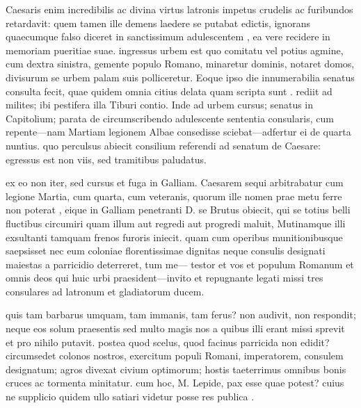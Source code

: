  Caesaris enim incredibilis ac divina virtus latronis impetus crudelis ac furibundos retardavit: quem tamen ille demens laedere se putabat edictis, ignorans quaecumque falso diceret in sanctissimum adulescentem , ea vere recidere in memoriam pueritiae suae. ingressus urbem est quo comitatu vel potius agmine, cum dextra sinistra, gemente populo Romano, minaretur dominis, notaret domos, divisurum se urbem palam suis polliceretur. Eoque ipso die innumerabilia senatus consulta fecit, quae quidem omnia citius delata quam scripta sunt . rediit ad milites; ibi pestifera illa Tiburi contio. Inde ad urbem cursus; senatus in Capitolium; parata de circumscribendo adulescente sententia consularis, cum repente—nam Martiam legionem Albae consedisse sciebat—adfertur ei de quarta nuntius. quo perculsus abiecit consilium referendi ad senatum de Caesare: egressus est non viis, sed tramitibus paludatus.

 ex eo non iter, sed cursus et fuga in Galliam. Caesarem sequi arbitrabatur cum legione Martia, cum quarta, cum veteranis, quorum ille nomen prae metu ferre non poterat , eique in Galliam penetranti D. se Brutus obiecit, qui se totius belli fluctibus circumiri quam illum aut regredi aut progredi maluit, Mutinamque illi exsultanti tamquam frenos furoris iniecit. quam cum operibus munitionibusque saepsisset nec eum coloniae florentissimae dignitas neque consulis designati maiestas a parricidio deterreret, tum me— testor et vos et populum Romanum et omnis deos qui huic urbi praesident—invito et repugnante legati missi tres consulares ad latronum et gladiatorum ducem.

 quis tam barbarus umquam, tam immanis, tam ferus? non audivit, non respondit; neque eos solum praesentis sed multo magis nos a quibus illi erant missi sprevit et pro nihilo putavit. postea quod scelus, quod facinus parricida non edidit? circumsedet colonos nostros, exercitum populi Romani, imperatorem, consulem designatum; agros divexat civium optimorum; hostis taeterrimus omnibus bonis cruces ac tormenta minitatur. cum hoc, M. Lepide, pax esse quae potest? cuius ne supplicio quidem ullo satiari videtur posse res publica .


